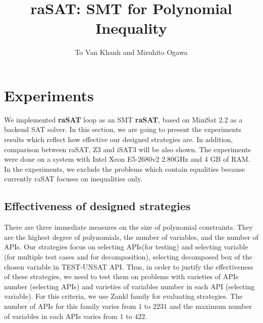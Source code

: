 \documentclass[runningheads,a4paper,oribibl]{llncs}
\begin{document}
%
\title{{\bf raSAT}: SMT for Polynomial Inequality}

\author{To Van Khanh and Mizuhito Ogawa} 

\maketitle

\section{Experiments} \label{sec:experiment}
We implemented \textbf{raSAT} loop as an SMT {\bf raSAT}, 
based on MiniSat 2.2 as a backend SAT solver. In this section, we are going to present the experiments results which reflect how effective our designed strategies are. In addition, comparison between raSAT, Z3 and iSAT3 will be also shown. The experiments were done on a system with  Intel Xeon E5-2680v2 2.80GHz and 4 GB of RAM. In the experiments, we exclude the problems which contain equalities because currently raSAT focuses on inequalities only.

\subsection {Effectiveness of designed strategies} 
\label{sec:strategies}
There are three immediate measures on the size of polynomial constraints. They are the highest degree of polynomials, the number of variables, and the number of APIs. Our strategies focus on selecting APIs(for testing) and selecting variable (for multiple test cases and for decomposition), selecting decomposed box of the chosen variable in TEST-UNSAT API. Thus, in order to justify the effectiveness of these strategies, we need to test them on problems with varieties of APIs number (selecting APIs) and varieties of variables number in each API (selecting variable). For this criteria, we use Zankl family for evaluating strategies. The number of APIs for this family varies from $1$ to $2231$ and the maximum number of variables in each APIs varies from $1$ to $422$. 
\end{document}
